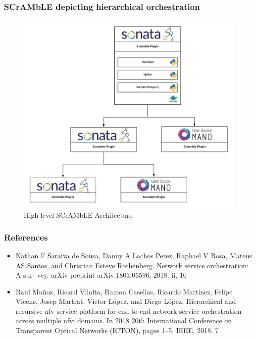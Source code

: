 \begin{frame}
\frametitle{SCrAMbLE depicting hierarchical orchestration}
\begin{figure}
	\centering
	\includegraphics[width=0.7\linewidth]{images/scramblearch}
	\caption{High-level SCrAMbLE Architecture }
	\label{fig:scramblearch}
\end{figure}

\end{frame}



\begin{frame}
\frametitle{References}
\begin{itemize}
	\item Nathan F Saraiva de Sousa, Danny A Lachos Perez, Raphael V Rosa, Mateus AS
	Santos, and Christian Esteve Rothenberg. Network service orchestration: A sur-
	vey. arXiv preprint arXiv:1803.06596, 2018. ii, 10
	
	\item Raul Muñoz, Ricard Vilalta, Ramon Casellas, Ricardo Martínez, Felipe Vicens,
	Josep Martrat, Víctor López, and Diego López. Hierarchical and recursive nfv
	service platform for end-to-end network service orchestration across multiple nfvi
	domains. In 2018 20th International Conference on Transparent Optical Networks
	(ICTON), pages 1–5. IEEE, 2018. 7
    
\end{itemize}
\end{frame}

